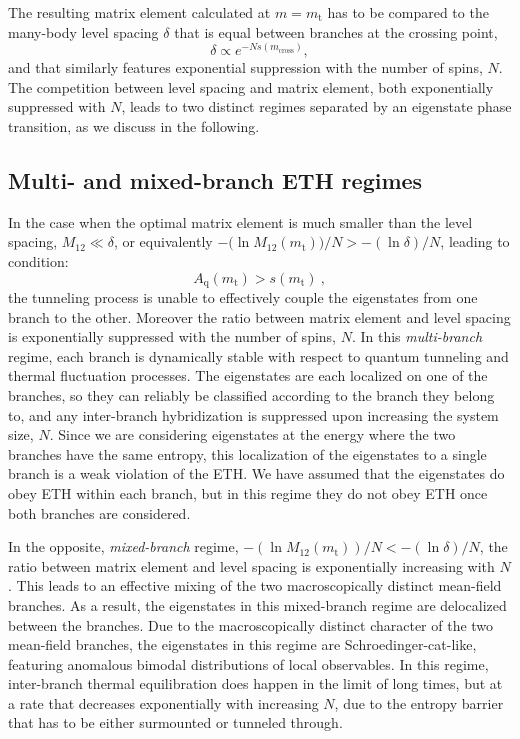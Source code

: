 \documentclass[aps,prx,showpacs,amsmath,amssymb,superscriptaddress,twocolumn,longbibliography,10pt,nofootinbib]{revtex4-2}
\begin{document}
The resulting matrix element calculated at $m=m_\text{t}$ has to be compared to the many-body level spacing $\delta$ that is equal between branches at the crossing point, 
\begin{equation}
\delta \propto e^{-N s(m_\text{cross})},
\end{equation}
and that similarly features exponential suppression with the number of spins, $N$. The competition between level spacing and matrix element, both exponentially suppressed with $N$, leads to two distinct regimes separated by an eigenstate phase transition, as we discuss in the following. 

\subsection{Multi- and mixed-branch ETH regimes}

In the case when the optimal matrix element is much smaller than the level spacing, $M_{12}\ll \delta$, or equivalently $-(\ln {M_{12}(m_\text{t}))}/{N} > -(\ln {\delta})/{N}$, leading to condition:
\begin{equation}\label{Eq:localized}
 A_\text{q}(m_\text{t}) > s(m_\text{t})~,
\end{equation}
the tunneling process is unable to effectively couple the eigenstates from one branch to the other. Moreover the ratio between matrix element and level spacing is exponentially suppressed with the number of spins, $N$. In this \emph{multi-branch} regime, each branch is dynamically stable with respect to quantum tunneling and thermal fluctuation processes.  The eigenstates are each localized on one of the branches, so they can reliably be classified according to the branch they belong to, and any inter-branch hybridization is suppressed upon increasing the system size, $N$.  Since we are considering eigenstates at the energy where the two branches have the same entropy, this localization of the eigenstates to a single branch is a weak violation of the ETH.  We have assumed that the eigenstates do obey ETH within each branch, but in this regime they do not obey ETH once both branches are considered.

In the opposite,  \emph{mixed-branch} regime, $ -(\ln M_{12}(m_\text{t}))/N < -(\ln {\delta})/{N}$, the ratio between matrix element and level spacing is exponentially increasing with $N$. This leads to an effective mixing of the two macroscopically distinct mean-field branches. As a result, the eigenstates in this mixed-branch regime are delocalized between the branches.  Due to the macroscopically distinct character of the two mean-field branches, the eigenstates in this regime are Schroedinger-cat-like, featuring anomalous bimodal distributions of local observables. In this regime, inter-branch thermal equilibration does happen in the limit of long times, but at a rate that decreases exponentially with increasing $N$, due to the entropy barrier that has to be either surmounted or tunneled through.
\end{document}
